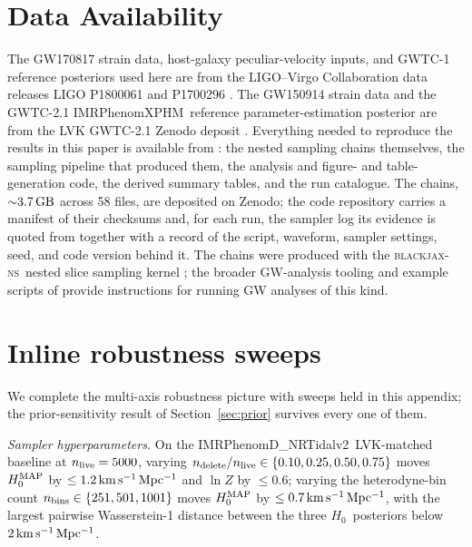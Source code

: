 \documentclass[usenatbib]{mnras}
\newcommand{\kmsmpc}{\ensuremath{\,\rm km\,s^{-1}\,Mpc^{-1}}\xspace}
\newcommand{\hzero}{\ensuremath{H_{0}}\xspace}
\newcommand{\IMR}{IMRPhenomD\_NRTidalv2\xspace}
\newcommand{\XPHM}{IMRPhenomXPHM\xspace}
\newcommand{\bjns}{\textsc{blackjax-ns}\xspace}
\begin{document}
\section*{Data Availability}

The GW170817 strain data, host-galaxy peculiar-velocity inputs, and GWTC-1 reference posteriors used here are from the LIGO--Virgo Collaboration data releases LIGO P1800061 and P1700296 \citep{LVK_GW170817_DataRelease,LVK_H0_DataRelease}. The GW150914 strain data and the GWTC-2.1 \XPHM\ reference parameter-estimation posterior are from the LVK GWTC-2.1 Zenodo deposit \citep{GWTC2p1_GW150914_Zenodo}. Everything needed to reproduce the results in this paper is available from \citet{Yang2026DataRelease}: the nested sampling chains themselves, the sampling pipeline that produced them, the analysis and figure- and table-generation code, the derived summary tables, and the run catalogue. The chains, ${\sim}3.7\,\rm GB$ across 58 files, are deposited on Zenodo; the code repository carries a manifest of their checksums and, for each run, the sampler log its evidence is quoted from together with a record of the script, waveform, sampler settings, seed, and code version behind it. The chains were produced with the \bjns\ nested slice sampling kernel \citep{Yallup2026BlackjaxNS}; the broader GW-analysis tooling and example scripts of \citet{Prathaban2025GPUSpeed} provide instructions for running GW analyses of this kind.




\appendix

\section{Inline robustness sweeps}
\label{app:robustness}

We complete the multi-axis robustness picture with sweeps held in this appendix; the prior-sensitivity result of Section~\ref{sec:prior} survives every one of them.

\emph{Sampler hyperparameters.} On the \IMR\ LVK-matched baseline at $n_{\rm live}=5000$, varying $n_{\rm delete}/n_{\rm live}\in\{0.10,0.25,0.50,0.75\}$ moves $\hzero^{\rm MAP}$ by $\le 1.2\kmsmpc$ and $\ln Z$ by $\le 0.6$; varying the heterodyne-bin count $n_{\rm bins}\in\{251,501,1001\}$ moves $\hzero^{\rm MAP}$ by $\le 0.7\kmsmpc$, with the largest pairwise Wasserstein-1 distance between the three \hzero\ posteriors below $2\kmsmpc$.
\end{document}
